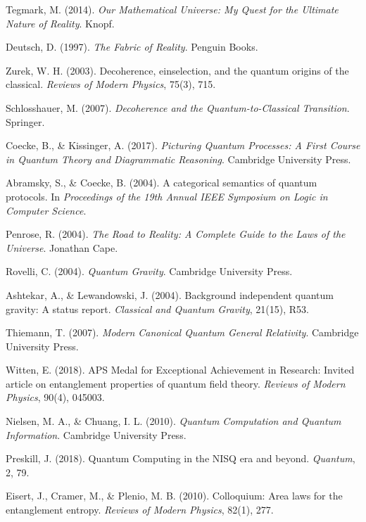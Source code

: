 \documentclass[12pt,a4paper]{article}
\begin{document}
\begin{thebibliography}{99}
 Tegmark, M. (2014). \textit{Our Mathematical Universe: My Quest for the Ultimate Nature of Reality}. Knopf.

 Deutsch, D. (1997). \textit{The Fabric of Reality}. Penguin Books.

 Zurek, W. H. (2003). Decoherence, einselection, and the quantum origins of the classical. \textit{Reviews of Modern Physics}, 75(3), 715.

 Schlosshauer, M. (2007). \textit{Decoherence and the Quantum-to-Classical Transition}. Springer.

 Coecke, B., \& Kissinger, A. (2017). \textit{Picturing Quantum Processes: A First Course in Quantum Theory and Diagrammatic Reasoning}. Cambridge University Press.

 Abramsky, S., \& Coecke, B. (2004). A categorical semantics of quantum protocols. In \textit{Proceedings of the 19th Annual IEEE Symposium on Logic in Computer Science}.

 Penrose, R. (2004). \textit{The Road to Reality: A Complete Guide to the Laws of the Universe}. Jonathan Cape.

 Rovelli, C. (2004). \textit{Quantum Gravity}. Cambridge University Press.

 Ashtekar, A., \& Lewandowski, J. (2004). Background independent quantum gravity: A status report. \textit{Classical and Quantum Gravity}, 21(15), R53.

 Thiemann, T. (2007). \textit{Modern Canonical Quantum General Relativity}. Cambridge University Press.

 Witten, E. (2018). APS Medal for Exceptional Achievement in Research: Invited article on entanglement properties of quantum field theory. \textit{Reviews of Modern Physics}, 90(4), 045003.

 Nielsen, M. A., \& Chuang, I. L. (2010). \textit{Quantum Computation and Quantum Information}. Cambridge University Press.

 Preskill, J. (2018). Quantum Computing in the NISQ era and beyond. \textit{Quantum}, 2, 79.

 Eisert, J., Cramer, M., \& Plenio, M. B. (2010). Colloquium: Area laws for the entanglement entropy. \textit{Reviews of Modern Physics}, 82(1), 277.


\end{thebibliography}
\end{document}
